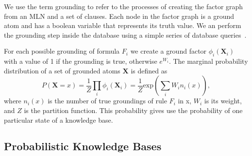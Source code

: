 We use the term grounding to refer to the processes of creating the factor graph from an
MLN and a set of clauses.
Each node in the factor graph is a ground atom and has a boolean variable that represents its truth value.
We an perform the grounding step inside the database using a simple series of database queries~\cite{chen2014knowledge}.

For each possible grounding of formula \(F_i\) we create a ground factor
\(\phi_i(\mathbf{X}_i)\) with a value of 1 if the grounding is true, otherwise
\(e^{W_i}\). The marginal probability distribution of a set of grounded atoms \(\mathbf{X}\) is defined as
\begin{equation}
\label{eq:probqa-marginal}
P(\mathbf{X} = x) = \frac{1}{Z} \prod_i \phi_i (\mathbf{X}_i) = \frac{1}{Z} \text{exp} \left( \sum_i W_i n_i(x) \right),
\end{equation}
where \(n_i(x)\) is the number of true groundings of rule \(F_i\) in x, \(W_i\) is its weight, and \(Z\) is the partition function.
This probability gives use the probability of one particular state of a knowledge base.







\subsection{Probabilistic Knowledge Bases}

